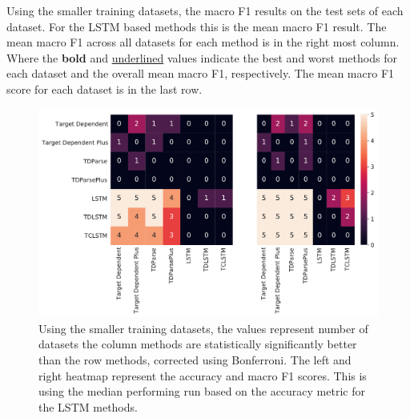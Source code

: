 \begin{table}[!h]
    \centering
    
    \caption{Using the smaller training datasets, the macro F1 results on the test sets of each dataset. For the LSTM based methods this is the mean macro F1 result. The mean macro F1 across all datasets for each method is in the right most column. Where the \textbf{bold} and \underline{underlined} values indicate the best and worst methods for each dataset and the overall mean macro F1, respectively. The mean macro F1 score for each dataset is in the last row.}
    \label{table:repro_small_mass_eval_macro_f1}
\end{table}

\begin{figure}[!h]
    \centering
    \includegraphics[scale=0.4]{images/reproducibility/Small_Sig_Test.pdf}
    \caption{Using the smaller training datasets, the values represent number of datasets the column methods are statistically significantly better than the row methods, corrected using Bonferroni. The left and right heatmap represent the accuracy and macro F1 scores. This is using the median performing run based on the accuracy metric for the LSTM methods.}
    \label{figure:repro_mass_eval_small_test_sig_results}
\end{figure}

